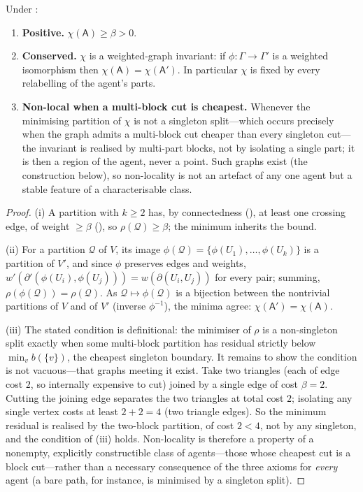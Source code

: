 \documentclass[11pt,twocolumn,a4paper]{article}
\newcommand{\Agent}{\mathsf{A}}
\newcommand{\Self}{\Gamma}          %
\newcommand{\V}{V}
\newcommand{\wt}{w}
\newcommand{\floorc}{\beta}          %
\newcommand{\cut}{\partial}
\newcommand{\Char}{\chi}             %
\begin{document}
\begin{theorem}
\label{thm:identity}
Under :
\begin{enumerate}[label=\textup{(\roman*)},leftmargin=2.2em]
\item \textbf{Positive.} $\Char(\Agent)\ge\floorc>0$.
\item \textbf{Conserved.} $\Char$ is a weighted-graph invariant: if
$\phi:\Self\to\Self'$ is a weighted isomorphism then
$\Char(\Agent)=\Char(\Agent')$. In particular $\Char$ is fixed by every
relabelling of the agent's parts.
\item \textbf{Non-local when a multi-block cut is cheapest.} Whenever the
minimising partition of $\Char$ is not a singleton split---which occurs
precisely when the graph admits a multi-block cut cheaper than every
singleton cut---the invariant is realised by multi-part blocks, not by
isolating a single part; it is then a region of the agent, never a point.
Such graphs exist (the construction below), so non-locality is not an
artefact of any one agent but a stable feature of a characterisable class.
\end{enumerate}
\end{theorem}

\begin{proof}
(i) A partition with $k\ge2$ has, by connectedness (), at
least one crossing edge, of weight $\ge\floorc$ (), so
$\rho(\mathcal{Q})\ge\floorc$; the minimum inherits the bound.

(ii) For a partition $\mathcal{Q}$ of $\V$, its image
$\phi(\mathcal{Q})=\{\phi(U_1),\dots,\phi(U_k)\}$ is a partition of $\V'$,
and since $\phi$ preserves edges and weights,
$\wt'(\cut'(\phi(U_i),\phi(U_j)))=\wt(\cut(U_i,U_j))$ for every pair;
summing, $\rho(\phi(\mathcal{Q}))=\rho(\mathcal{Q})$. As
$\mathcal{Q}\mapsto\phi(\mathcal{Q})$ is a bijection between the
nontrivial partitions of $\V$ and of $\V'$ (inverse $\phi^{-1}$), the
minima agree: $\Char(\Agent')=\Char(\Agent)$.

(iii) The stated condition is definitional: the minimiser of $\rho$ is a
non-singleton split exactly when some multi-block partition has residual
strictly below $\min_v b(\{v\})$, the cheapest singleton boundary. It
remains to show the condition is not vacuous---that graphs meeting it
exist. Take two triangles (each of edge cost $2$, so internally expensive
to cut) joined by a single edge of cost $\floorc=2$. Cutting the joining
edge separates the two triangles at total cost $2$; isolating any single
vertex costs at least $2+2=4$ (two triangle edges). So the minimum residual
is realised by the two-block partition, of cost $2<4$, not by any
singleton, and the condition of (iii) holds. Non-locality is therefore a
property of a nonempty, explicitly constructible class of agents---those
whose cheapest cut is a block cut---rather than a necessary consequence of
the three axioms for \emph{every} agent (a bare path, for instance, is
minimised by a singleton split).
\end{proof}
\end{document}
